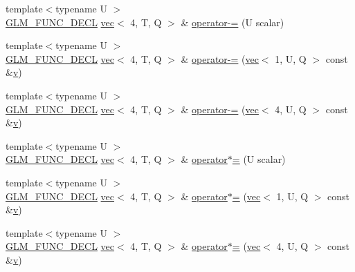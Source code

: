 \begin{DoxyCompactItemize}
\item 
{\footnotesize template$<$typename U $>$ }\\\mbox{\hyperlink{setup_8hpp_ab2d052de21a70539923e9bcbf6e83a51}{G\+L\+M\+\_\+\+F\+U\+N\+C\+\_\+\+D\+E\+CL}} \mbox{\hyperlink{structglm_1_1vec}{vec}}$<$ 4, T, Q $>$ \& \mbox{\hyperlink{structglm_1_1vec_3_014_00_01_t_00_01_q_01_4_ad007bb786d8d34db95ee6fd2661cd1b8}{operator-\/=}} (U scalar)
\item 
{\footnotesize template$<$typename U $>$ }\\\mbox{\hyperlink{setup_8hpp_ab2d052de21a70539923e9bcbf6e83a51}{G\+L\+M\+\_\+\+F\+U\+N\+C\+\_\+\+D\+E\+CL}} \mbox{\hyperlink{structglm_1_1vec}{vec}}$<$ 4, T, Q $>$ \& \mbox{\hyperlink{structglm_1_1vec_3_014_00_01_t_00_01_q_01_4_a7cf5d44f1e5c5a5cc24c6d8fc4799b81}{operator-\/=}} (\mbox{\hyperlink{structglm_1_1vec}{vec}}$<$ 1, U, Q $>$ const \&\mbox{\hyperlink{_s_d_l__opengl_8h_a10a82eabcb59d2fcd74acee063775f90}{v}})
\item 
{\footnotesize template$<$typename U $>$ }\\\mbox{\hyperlink{setup_8hpp_ab2d052de21a70539923e9bcbf6e83a51}{G\+L\+M\+\_\+\+F\+U\+N\+C\+\_\+\+D\+E\+CL}} \mbox{\hyperlink{structglm_1_1vec}{vec}}$<$ 4, T, Q $>$ \& \mbox{\hyperlink{structglm_1_1vec_3_014_00_01_t_00_01_q_01_4_a6c7121aa85c158912c509760cf65da75}{operator-\/=}} (\mbox{\hyperlink{structglm_1_1vec}{vec}}$<$ 4, U, Q $>$ const \&\mbox{\hyperlink{_s_d_l__opengl_8h_a10a82eabcb59d2fcd74acee063775f90}{v}})
\item 
{\footnotesize template$<$typename U $>$ }\\\mbox{\hyperlink{setup_8hpp_ab2d052de21a70539923e9bcbf6e83a51}{G\+L\+M\+\_\+\+F\+U\+N\+C\+\_\+\+D\+E\+CL}} \mbox{\hyperlink{structglm_1_1vec}{vec}}$<$ 4, T, Q $>$ \& \mbox{\hyperlink{structglm_1_1vec_3_014_00_01_t_00_01_q_01_4_a084756852ac777dca065e256f72aa75f}{operator$\ast$=}} (U scalar)
\item 
{\footnotesize template$<$typename U $>$ }\\\mbox{\hyperlink{setup_8hpp_ab2d052de21a70539923e9bcbf6e83a51}{G\+L\+M\+\_\+\+F\+U\+N\+C\+\_\+\+D\+E\+CL}} \mbox{\hyperlink{structglm_1_1vec}{vec}}$<$ 4, T, Q $>$ \& \mbox{\hyperlink{structglm_1_1vec_3_014_00_01_t_00_01_q_01_4_a4b89052935e5383d7b04478b91a25823}{operator$\ast$=}} (\mbox{\hyperlink{structglm_1_1vec}{vec}}$<$ 1, U, Q $>$ const \&\mbox{\hyperlink{_s_d_l__opengl_8h_a10a82eabcb59d2fcd74acee063775f90}{v}})
\item 
{\footnotesize template$<$typename U $>$ }\\\mbox{\hyperlink{setup_8hpp_ab2d052de21a70539923e9bcbf6e83a51}{G\+L\+M\+\_\+\+F\+U\+N\+C\+\_\+\+D\+E\+CL}} \mbox{\hyperlink{structglm_1_1vec}{vec}}$<$ 4, T, Q $>$ \& \mbox{\hyperlink{structglm_1_1vec_3_014_00_01_t_00_01_q_01_4_a27ac62ee4c5d423e772c40d015ee54da}{operator$\ast$=}} (\mbox{\hyperlink{structglm_1_1vec}{vec}}$<$ 4, U, Q $>$ const \&\mbox{\hyperlink{_s_d_l__opengl_8h_a10a82eabcb59d2fcd74acee063775f90}{v}})

\end{DoxyCompactItemize}
